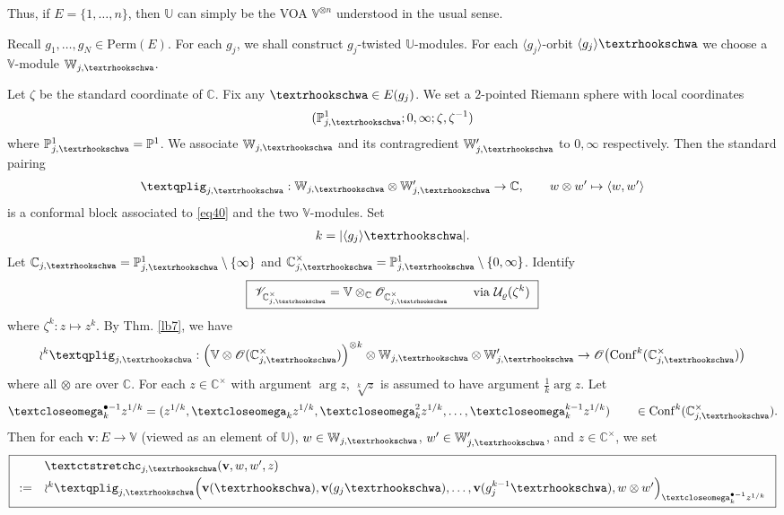 \documentclass[11pt,b5paper,notitlepage]{article}
\theoremstyle{definition}
\theoremstyle{plain}
\newcommand{\mc}{\mathcal}
\newcommand{\Conf}{\mathrm{Conf}}
\newcommand{\bk}[1]{\langle {#1}\rangle}
\newcommand{\scr}{\mathscr}
\newcommand{\mbb}{\mathbb}
\newcommand{\blt}{\bullet}
\newcommand{\Vbb}{\mathbb V}
\newcommand{\Ubb}{\mathbb U}
\newcommand{\Wbb}{\mathbb W}
\newcommand{\Cbb}{\mathbb C}
\newcommand{\Pbb}{\mathbb P}
\newcommand{\vbf}{\mathbf v}
\newcommand{\Perm}{\mathrm{Perm}}
\newcommand{\tipaomega}{\text{\textcloseomega}}
\newcommand{\tipae}{\text{\textrhookschwa}}
\newcommand{\tipxcc}{\text{\textctstretchc}}
\newcommand{\tipxphi}{\text{\textqplig}}
\numberwithin{equation}{subsection}
\begin{document}
Thus, if $E=\{1,\dots,n\}$, then $\Ubb$ can simply be the VOA $\Vbb^{\otimes n}$ understood in the usual sense.


Recall $g_1,\dots,g_N\in\Perm(E)$. For each $g_j$, we shall construct $g_j$-twisted $\mbb U$-modules. For each $\bk{g_j}$-orbit $\bk{g_j}\tipae$ we choose a $\Vbb$-module $\Wbb_{j,\tipae}$.

Let $\zeta$ be the standard coordinate of $\Cbb$. Fix any $\tipae\in E(g_j)$. We set a $2$-pointed Riemann sphere with local coordinates
\begin{align}
(\Pbb^1_{j,\tipae};0,\infty;\zeta,\zeta^{-1})	\label{eq40}
\end{align}
where $\Pbb^1_{j,\tipae}=\Pbb^1$. We associate $\Wbb_{j,\tipae}$ and its contragredient  $\Wbb_{j,\tipae}'$ to $0,\infty$ respectively. Then the standard pairing \index{zz@$\tipxphi_{j,\tipae}$}
\begin{gather}
\tipxphi_{j,\tipae}:	\Wbb_{j,\tipae}\otimes \Wbb_{j,\tipae}'\rightarrow\Cbb, \qquad w\otimes w'\mapsto \bk{w,w'}\label{eq33}
\end{gather}
is a conformal block associated to \eqref{eq40} and the two $\Vbb$-modules. Set
\begin{align}
{k}=|\bk{g_j}\tipae|.	
\end{align}
Let $\Cbb_{j,\tipae}=\Pbb_{j,\tipae}^1\setminus\{\infty\}$ and $\Cbb_{j,\tipae}^\times=\Pbb_{j,\tipae}^1\setminus\{0,\infty\}$. Identify
\begin{align}
\boxed{~\scr V_{\Cbb^\times_{j,\tipae}}=\Vbb\otimes_\Cbb\scr O_{\Cbb^\times_{j,\tipae}}\qquad \text{via }\mc U_\varrho(\zeta^{{k}})~}\label{eq35}
\end{align}
where $\zeta^k:z\mapsto z^k$. By Thm. \ref{lb7}, we have
\begin{align*}
\wr^{{k}}\tipxphi_{j,\tipae}:\Big(\Vbb\otimes\scr O(\Cbb_{j,\tipae}^\times)\Big)^{\otimes {k}}\otimes \Wbb_{j,\tipae}\otimes \Wbb_{j,\tipae}'\rightarrow\scr O\big(\Conf^{{k}}(\Cbb_{j,\tipae}^\times)\big)
\end{align*}
where all $\otimes$ are over $\Cbb$. For each $z\in\Cbb^\times$ with argument $\arg z$,  $\sqrt[k]z$ is assumed to have argument $\frac 1k\arg z$. Let \index{zz@$\tipaomega_k^{\blt-1}z^{1/k}$}
\begin{align*}
\tipaomega_k^{\blt-1}z^{1/k}=(z^{1/k},\tipaomega_kz^{1/k},\tipaomega_k^2z^{1/k},\dots,\tipaomega_k^{k-1}z^{1/k})	\qquad\in\Conf^k(\Cbb^\times_{j,\tipae}).
\end{align*}
Then for each $\vbf:E\rightarrow \Vbb$ (viewed as an element of $\Ubb$), $w\in \Wbb_{j,\tipae}$, $w'\in \Wbb_{j,\tipae}'$, and $z\in\Cbb^\times$, we set \index{zz@$\tipxcc_{j,\tipae}$}
\begin{align}
\boxed{\begin{array}{rl}
&\tipxcc_{j,\tipae}(\vbf,w,w',z)\\[0.7ex]
:=&	\wr^{{k}}\tipxphi_{j,\tipae}\Big(\vbf(\tipae),\vbf(g_j\tipae),\dots,\vbf(g_j^{{k}-1}\tipae), w\otimes w'\Big)_{\tipaomega_{{k}}^{\blt-1}z^{1/{k}}}
\end{array}}	\label{eq29}
\end{align}
\end{document}
